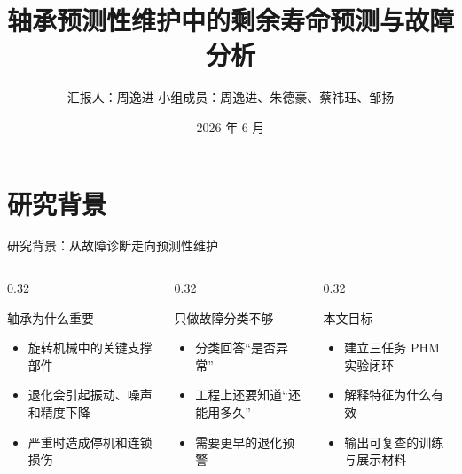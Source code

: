 \documentclass[aspectratio=169,11pt]{ctexbeamer}
\title[轴承 PHM 结题答辩]{轴承预测性维护中的剩余寿命预测与故障分析}
\subtitle{}
\author[周逸进]{汇报人：周逸进 \quad 小组成员：周逸进、朱德豪、蔡祎珏、邹扬}
\institute[USTC]{中国科学技术大学 \quad 软件学院}
\date{2026 年 6 月}
\begin{document}
\maketitleframe

\section{研究背景}

\begin{frame}[t]{研究背景：从故障诊断走向预测性维护}
  \begin{columns}[T,onlytextwidth]
    \begin{column}{0.32\textwidth}
      \begin{block}{轴承为什么重要}
        \begin{itemize}
          \item 旋转机械中的关键支撑部件
          \item 退化会引起振动、噪声和精度下降
          \item 严重时造成停机和连锁损伤
        \end{itemize}
      \end{block}
    \end{column}
    \begin{column}{0.32\textwidth}
      \begin{block}{只做故障分类不够}
        \begin{itemize}
          \item 分类回答“是否异常”
          \item 工程上还要知道“还能用多久”
          \item 需要更早的退化预警
        \end{itemize}
      \end{block}
    \end{column}
    \begin{column}{0.32\textwidth}
      \begin{block}{本文目标}
        \begin{itemize}
          \item 建立三任务 PHM 实验闭环
          \item 解释特征为什么有效
          \item 输出可复查的训练与展示材料
        \end{itemize}
      \end{block}
    \end{column}
  \end{columns}


\end{frame}
\end{document}
